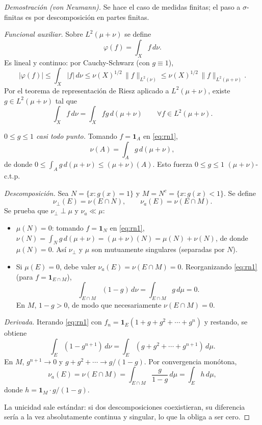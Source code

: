 \documentclass[11pt, a4paper]{article}
\begin{document}
\begin{proof}[Demostración (von Neumann)]
Se hace el caso de medidas finitas; el paso a $\sigma$-finitas es por descomposición en partes
finitas.

\textit{Funcional auxiliar.} Sobre $L^2(\mu + \nu)$ se define
$$ \varphi(f) = \int_X f \, d\nu. $$
Es lineal y continuo: por Cauchy-Schwarz (con $g \equiv 1$),
$$ |\varphi(f)| \le \int_X |f| \, d\nu \le \nu(X)^{1/2} \, \|f\|_{L^2(\nu)} \le \nu(X)^{1/2} \,
\|f\|_{L^2(\mu+\nu)}. $$
Por el teorema de representación de Riesz aplicado a $L^2(\mu + \nu)$, existe $g \in
L^2(\mu + \nu)$ tal que
\begin{equation}\label{eq:rn1}
\int_X f \, d\nu = \int_X f g \, d(\mu + \nu) \qquad \forall f \in L^2(\mu + \nu).
\end{equation}

\textit{$0 \le g \le 1$ casi todo punto.} Tomando $f = \mathbf{1}_A$ en \eqref{eq:rn1},
$$ \nu(A) = \int_A g \, d(\mu + \nu), $$
de donde $0 \le \int_A g \, d(\mu + \nu) \le (\mu + \nu)(A)$. Esto fuerza $0 \le g \le 1$
$(\mu + \nu)$-c.t.p.

\textit{Descomposición.} Sea $N = \{x : g(x) = 1\}$ y $M = N^c = \{x : g(x) < 1\}$. Se define
$$ \nu_\perp(E) = \nu(E \cap N), \qquad \nu_a(E) = \nu(E \cap M). $$
Se prueba que $\nu_\perp \perp \mu$ y $\nu_a \ll \mu$:
\begin{itemize}
    \item $\mu(N) = 0$: tomando $f = \mathbf{1}_N$ en \eqref{eq:rn1},
    $\nu(N) = \int_N g \, d(\mu+\nu)
    = (\mu+\nu)(N) = \mu(N) + \nu(N)$, de donde $\mu(N) = 0$. Así $\nu_\perp$ y $\mu$ son
    mutuamente singulares (separadas por $N$).
    \item Si $\mu(E) = 0$, debe valer $\nu_a(E) = \nu(E \cap M) = 0$. Reorganizando \eqref{eq:rn1}
    (para $f = \mathbf{1}_{E \cap M}$),
    $$ \int_{E \cap M} (1 - g) \, d\nu = \int_{E \cap M} g \, d\mu = 0. $$
    En $M$, $1 - g > 0$, de modo que necesariamente $\nu(E \cap M) = 0$.
\end{itemize}

\textit{Derivada.} Iterando \eqref{eq:rn1} con $f_n = \mathbf{1}_E (1 + g + g^2 + \cdots + g^n)$ y
restando, se obtiene
$$ \int_E (1 - g^{n+1}) \, d\nu = \int_E (g + g^2 + \cdots + g^{n+1}) \, d\mu. $$
En $M$, $g^{n+1} \to 0$ y $g + g^2 + \cdots \to g/(1-g)$. Por convergencia monótona,
$$ \nu_a(E) = \nu(E \cap M) = \int_{E \cap M} \frac{g}{1 - g} \, d\mu = \int_E h \, d\mu, $$
donde $h = \mathbf{1}_M \cdot g/(1 - g)$.

La unicidad sale estándar: si dos descomposiciones coexistieran, su diferencia sería a la vez
absolutamente continua y singular, lo que la obliga a ser cero.
\end{proof}
\end{document}
